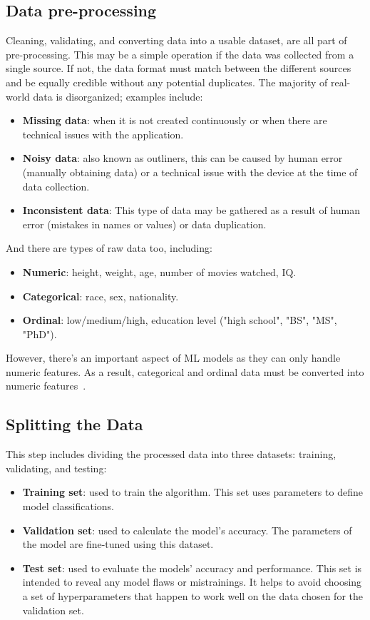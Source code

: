 \subsection{Data pre-processing}

Cleaning, validating, and converting data into a usable dataset, are all part of pre-processing. This may be a simple operation if the data was collected from a single source. If not, the data format must match between the different sources and be equally credible without any potential duplicates. The majority of real-world data is disorganized; examples include:
\begin{itemize}
    \item \textbf{Missing data}: when it is not created continuously or when there are technical issues with the application.
    \item \textbf{Noisy data}: also known as outliners, this can be caused by human error (manually obtaining data) or a technical issue with the device at the time of data collection.
    \item \textbf{Inconsistent data}: This type of data may be gathered as a result of human error (mistakes in names or values) or data duplication.
\end{itemize}

And there are types of raw data too, including:

\begin{itemize}
    \item \textbf{Numeric}: height, weight, age, number of movies watched, IQ.
    \item \textbf{Categorical}: race, sex, nationality.
    \item \textbf{Ordinal}: low/medium/high, education level ("high school", "BS", "MS", "PhD").
\end{itemize}

However, there's an important aspect of \gls{ML} models as they can only handle numeric features. As a result, categorical and ordinal data must be converted into numeric features~\cite{Pant2019WorkflowProject}.


\subsection{Splitting the Data}

This step includes dividing the processed data into three datasets: training, validating, and testing:

\begin{itemize}
    \item \textbf{Training set}: used to train the algorithm. This set uses parameters to define model classifications.
    \item \textbf{Validation set}: used to calculate the model's accuracy. The parameters of the model are fine-tuned using this dataset.
    \item \textbf{Test set}: used to evaluate the models' accuracy and performance. This set is intended to reveal any model flaws or mistrainings. It helps to avoid choosing a set of hyperparameters that happen to work well on the data chosen for the validation set.
\end{itemize}

